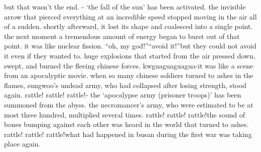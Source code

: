 but that wasn’t the end.
- ‘the fall of the sun’ has been activated.
the invisible arrow that pierced everything at an incredible speed stopped moving in the air all of a sudden.
 shortly afterward, it lost its shape and coalesced into a single point.
the next moment a tremendous amount of energy began to burst out of that point.
it was like nuclear fission.
“oh, my god!”“avoid it!”but they could not avoid it even if they wanted to.
 huge explosions that started from the air pressed down, swept, and burned the fleeing chinese forces.
kwguaguaguagua-it was like a scene from an apocalyptic movie.
 when so many chinese soldiers turned to ashes in the flames, sungwoo’s undead army, who had collapsed after losing strength, stood again.
rattle! rattle! rattle!- the ‘apocalypse army (prisoner troops)’ has been summoned from the abyss.
the necromancer’s army, who were estimated to be at most three hundred, multiplied several times.
rattle! rattle! rattle!the sound of bones bumping against each other was heard in the world that turned to ashes.
rattle! rattle! rattle!what had happened in busan during the first war was taking place again.


 